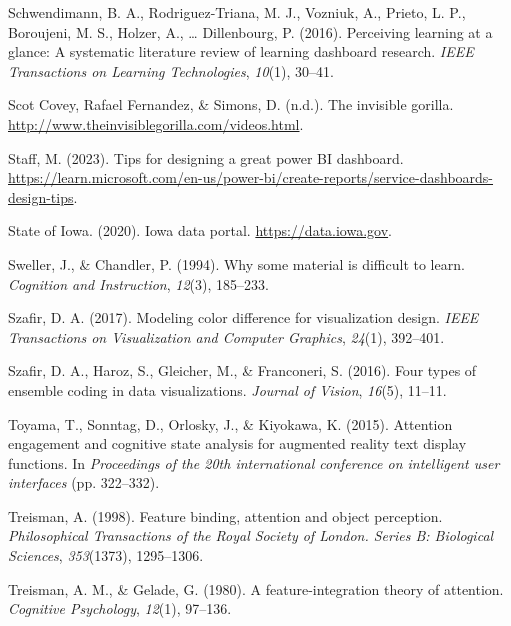 \documentclass[print]{nuthesis}
\newlength{\cslhangindent}
\newenvironment{CSLReferences}[2]%
{\setlength{\parindent}{0pt}%
\everypar{\setlength{\hangindent}{\cslhangindent}}\ignorespaces}%
{\par}
\begin{document}
\begin{CSLReferences}{1}{0}
\leavevmode{}%
Schwendimann, B. A., Rodriguez-Triana, M. J., Vozniuk, A., Prieto, L. P., Boroujeni, M. S., Holzer, A., \ldots{} Dillenbourg, P. (2016). Perceiving learning at a glance: A systematic literature review of learning dashboard research. \emph{IEEE Transactions on Learning Technologies}, \emph{10}(1), 30--41.

\leavevmode{}%
Scot Covey, Rafael Fernandez, \& Simons, D. (n.d.). The invisible gorilla. \url{http://www.theinvisiblegorilla.com/videos.html}.

\leavevmode{}%
Staff, M. (2023). Tips for designing a great power BI dashboard. \url{https://learn.microsoft.com/en-us/power-bi/create-reports/service-dashboards-design-tips}.

\leavevmode{}%
State of Iowa. (2020). Iowa data portal. \url{https://data.iowa.gov}.

\leavevmode{}%
Sweller, J., \& Chandler, P. (1994). Why some material is difficult to learn. \emph{Cognition and Instruction}, \emph{12}(3), 185--233.

\leavevmode{}%
Szafir, D. A. (2017). Modeling color difference for visualization design. \emph{IEEE Transactions on Visualization and Computer Graphics}, \emph{24}(1), 392--401.

\leavevmode{}%
Szafir, D. A., Haroz, S., Gleicher, M., \& Franconeri, S. (2016). Four types of ensemble coding in data visualizations. \emph{Journal of Vision}, \emph{16}(5), 11--11.

\leavevmode{}%
Toyama, T., Sonntag, D., Orlosky, J., \& Kiyokawa, K. (2015). Attention engagement and cognitive state analysis for augmented reality text display functions. In \emph{Proceedings of the 20th international conference on intelligent user interfaces} (pp. 322--332).

\leavevmode{}%
Treisman, A. (1998). Feature binding, attention and object perception. \emph{Philosophical Transactions of the Royal Society of London. Series B: Biological Sciences}, \emph{353}(1373), 1295--1306.

\leavevmode{}%
Treisman, A. M., \& Gelade, G. (1980). A feature-integration theory of attention. \emph{Cognitive Psychology}, \emph{12}(1), 97--136.


\end{CSLReferences}
\end{document}
